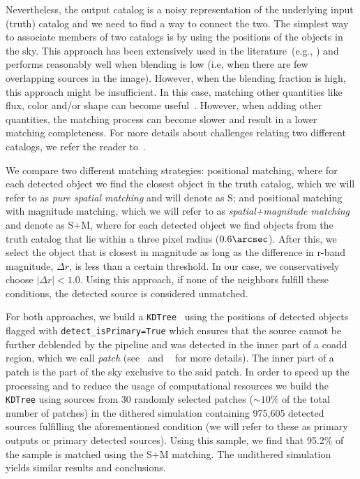 \documentclass[\docopts]{\docclass}
\begin{document}
Nevertheless, the output catalog is a noisy representation of the underlying input (truth) catalog and we need to find a way to connect the two. 
The simplest way to associate members of two catalogs is by using the positions of the objects in the sky. This approach has been extensively used in the literature~(e.g., \citealt{1977A&AS...28..211D,1983Obs...103..150B,1986MNRAS.223..279W}) and performs reasonably well when blending is low (i.e, when there are few overlapping sources in the image). However, when the blending fraction is high, this approach might be insufficient. In this case, matching other quantities like flux, color and/or shape can become useful~\citep{2008ApJ...679..301B, doi:10.1146/annurev-statistics-010814-020231}. However, when adding other quantities, the matching process can become slower and result in a lower matching completeness. For more details about challenges relating two different catalogs, we refer the reader to~\citet{doi:10.1146/annurev-statistics-010814-020231}. 

We compare two different matching strategies: positional matching, where for each detected object we find the closest object in the truth catalog, which we will refer to as \textit{pure spatial matching} and will denote as \textsf{S}; and positional matching with magnitude matching, which we will refer to as \textit{spatial+magnitude matching} and denote as \textsf{S+M}, where for each detected object we find objects from the truth catalog that lie within a three pixel radius ($0.6 \arcsec$). After this, we select the object that is closest in magnitude as long as the difference in r-band magnitude, $\Delta r$, is less than a certain threshold. In our case, we conservatively choose $|\Delta r| < 1.0$. Using this approach, if none of the neighbors fulfill these conditions, the detected source is considered unmatched.

For both approaches, we build a \texttt{KDTree}~\citep{scikit-learn} using the positions of detected objects flagged with \texttt{detect\_isPrimary=True} which ensures that the source cannot be further deblended by the pipeline and was detected in the inner part of a coadd region, which we call \textit{patch} (see~\citet{2018PASJ...70S...5B} and ~\citet{2018PASJ...70S..25M} for more details). The inner part of a patch is the part of the sky exclusive to the said patch. In order to speed up the processing and to reduce the usage of computational resources we build the \texttt{KDTree} using sources from 30 randomly selected patches ($\sim 10\%$ of the total number of patches) in the dithered simulation containing 975,605 detected sources fulfilling the aforementioned condition (we will refer to these as primary outputs or primary detected sources). Using this sample, we find that 95.2\% of the sample is matched using the \textsf{S+M} matching. The undithered simulation yields similar results and conclusions. 
\end{document}
